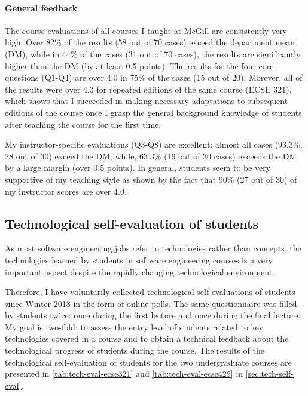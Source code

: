 \paragraph{General feedback}
The course evaluations of all courses I taught at McGill are consistently very high. Over 82\% of the results (58 out of 70 cases) exceed the department mean (DM), while in 44\% of the cases (31 out of 70 cases), the results are significantly higher than the DM (by at least 0.5 points). 
The results for the four core questions (Q1-Q4) are over 4.0 in 75\% of the cases (15 out of 20). Morever, all of the results 
were over 4.3 for repeated editions of the same course (ECSE 321), which shows that I succeeded in making necessary 
adaptations to subsequent editions of the course once I grasp the general background knowledge of students after teaching 
the course for the first time. 

My instructor-specific evaluations (Q3-Q8) are excellent: almost all cases (93.3\%, 28 out of 30) exceed the DM; while, 
63.3\% (19 out of 30 cases) exceeds the DM by a large margin (over 0.5 points).  In general, students seem to be very 
supportive of my teaching style as shown by the fact that 90\% (27 out of 30) of my instructor scores are over 4.0.

\subsection{Technological self-evaluation of students}
As most software engineering jobs refer to technologies rather than concepts, the technologies learned by students in software engineering courses is a very important aspect despite the rapidly changing technological environment.

Therefore, I have voluntarily collected technological self-evaluations of students since Winter 2018 in the form of online polls. The same questionnaire was filled by students twice: once during the first lecture and once during the final lecture. My goal is two-fold: to assess the entry level of students related to key technologies covered in a course and to obtain a technical feedback about the technological progress of students during the course. 
The results of the technological self-evaluation of students for the two undergraduate courses are presented in \autoref{tab:tech-eval-ecse321} and \autoref{tab:tech-eval-ecse429} in \autoref{sec:tech-self-eval}.


